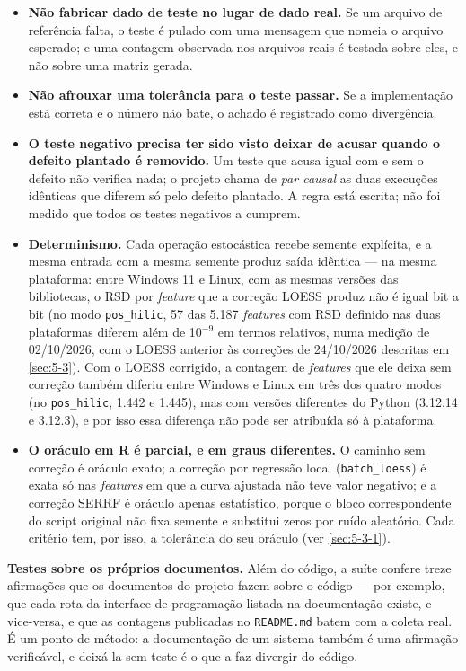 \begin{itemize}
\item \textbf{Não fabricar dado de teste no lugar de dado real.} Se um arquivo de referência falta, o teste é pulado com uma mensagem que nomeia o arquivo esperado; e uma contagem observada nos arquivos reais é testada sobre eles, e não sobre uma matriz gerada.
\item \textbf{Não afrouxar uma tolerância para o teste passar.} Se a implementação está correta e o número não bate, o achado é registrado como divergência.
\item \textbf{O teste negativo precisa ter sido visto deixar de acusar quando o defeito plantado é removido.} Um teste que acusa igual com e sem o defeito não verifica nada; o projeto chama de \textit{par causal} as duas execuções idênticas que diferem só pelo defeito plantado. A regra está escrita; não foi medido que todos os testes negativos a cumprem.
\item \textbf{Determinismo.} Cada operação estocástica recebe semente explícita, e a mesma entrada com a mesma semente produz saída idêntica --- na mesma plataforma: entre Windows 11 e Linux, com as mesmas versões das bibliotecas, o RSD por \textit{feature} que a correção LOESS produz não é igual bit a bit (no modo \texttt{pos\_\allowbreak{}hilic}, 57 das 5.187 \textit{features} com RSD definido nas duas plataformas diferem além de 10$^{-9}$ em termos relativos, numa medição de 02/10/2026, com o LOESS anterior às correções de 24/10/2026 descritas em \ref{sec:5-3}). Com o LOESS corrigido, a contagem de \textit{features} que ele deixa sem correção também diferiu entre Windows e Linux em três dos quatro modos (no \texttt{pos\_\allowbreak{}hilic}, 1.442 e 1.445), mas com versões diferentes do Python (3.12.14 e 3.12.3), e por isso essa diferença não pode ser atribuída só à plataforma.
\item \textbf{O oráculo em R é parcial, e em graus diferentes.} O caminho sem correção é oráculo exato; a correção por regressão local (\texttt{batch\_\allowbreak{}loess}) é exata só nas \textit{features} em que a curva ajustada não teve valor negativo; e a correção SERRF é oráculo apenas estatístico, porque o bloco correspondente do script original não fixa semente e substitui zeros por ruído aleatório. Cada critério tem, por isso, a tolerância do seu oráculo (ver \ref{sec:5-3-1}).
\end{itemize}


\textbf{Testes sobre os próprios documentos.} Além do código, a suíte confere treze afirmações que os documentos do projeto fazem sobre o código --- por exemplo, que cada rota da interface de programação listada na documentação existe, e vice-versa, e que as contagens publicadas no \texttt{README.\allowbreak{}md} batem com a coleta real. É um ponto de método: a documentação de um sistema também é uma afirmação verificável, e deixá-la sem teste é o que a faz divergir do código.


